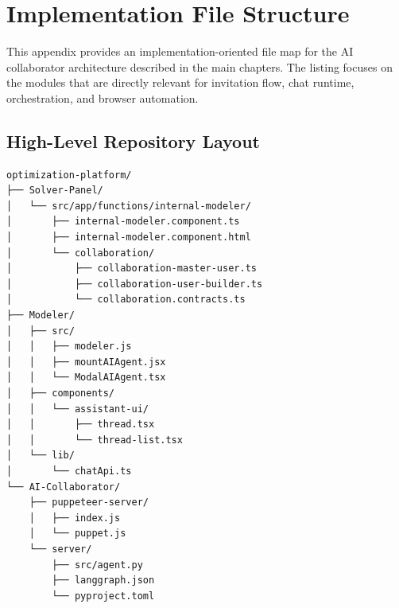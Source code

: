 \chapter{Implementation File Structure}
\label{sec:appendix-filestructure}

This appendix provides an implementation-oriented file map for the AI collaborator architecture described in the main chapters. The listing focuses on the modules that are directly relevant for invitation flow, chat runtime, orchestration, and browser automation.

\section{High-Level Repository Layout}
\begingroup
\footnotesize
\begin{verbatim}
optimization-platform/
├── Solver-Panel/
│   └── src/app/functions/internal-modeler/
│       ├── internal-modeler.component.ts
│       ├── internal-modeler.component.html
│       └── collaboration/
│           ├── collaboration-master-user.ts
│           ├── collaboration-user-builder.ts
│           └── collaboration.contracts.ts
├── Modeler/
│   ├── src/
│   │   ├── modeler.js
│   │   ├── mountAIAgent.jsx
│   │   └── ModalAIAgent.tsx
│   ├── components/
│   │   └── assistant-ui/
│   │       ├── thread.tsx
│   │       └── thread-list.tsx
│   └── lib/
│       └── chatApi.ts
└── AI-Collaborator/
    ├── puppeteer-server/
    │   ├── index.js
    │   └── puppet.js
    └── server/
        ├── src/agent.py
        ├── langgraph.json
        └── pyproject.toml
\end{verbatim}
\endgroup

